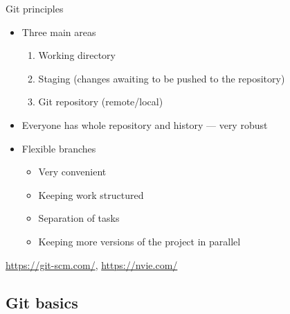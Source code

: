\documentclass[compress, ucs, xelatex, 11pt, xcolor=svgnames, aspectratio=169,
	hyperref={
		bookmarks=true,
		unicode=true,
		colorlinks=true,
		pdftitle={Linux, command line and MetaCentrum},
		plainpages=false,
		pdfauthor={Vojtech Zeisek},
		pdfsubject={Course about use of Linux command line, writing shell scripts and using MetaCentrum of CESNET},
		pdfcreator={XeLaTeX},
		pdfkeywords={Linux, GNU, BASH, shell, command line, MetaCentrum},
		linkcolor=DarkRed, %
		anchorcolor=DarkBlue, %
		citecolor=Indigo, %
		filecolor=NavyBlue, %
		menucolor=DarkMagenta, %
		urlcolor=DarkBlue, %
		pdftex},
	url={hyphens, lowtilde} %
	]{beamer}
\renewcommand{\texttt}[1]{\hl{\ttfamily #1}}
\begin{document}
\begin{frame}[fragile]{Git principles}
	\begin{multicols}{2}
		\begin{itemize}
			\item Three main areas
			\begin{enumerate}
				\item Working directory
				\item Staging (changes awaiting to be pushed to the repository)
				\item Git repository (remote/local)
			\end{enumerate}
			\item Everyone has whole repository and history --- very robust
			\item Flexible branches
			\begin{itemize}
				\item Very convenient
				\item Keeping work structured
				\item Separation of tasks
				\item Keeping more versions of the project in parallel
			\end{itemize}
		\end{itemize}
		\begin{center}
			\texttt{[image: git.png]}
		\end{center}
		\begin{flushright}
			\begin{footnotesize}
				\href{https://git-scm.com/book/en/v2/Getting-Started-Git-Basics}{https://git-scm.com/}, \href{https://nvie.com/posts/a-successful-git-branching-model/}{https://nvie.com/}
			\end{footnotesize}
		\end{flushright}
	\end{multicols}
\end{frame}

\subsection{Git basics}
\end{document}
